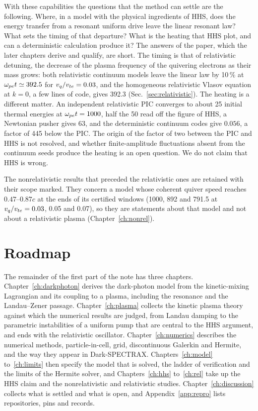 With these capabilities the questions that the method can settle are the following. Where, in a model with the physical ingredients of HHS, does the energy transfer from a resonant uniform drive leave the linear resonant law? What sets the timing of that departure? What is the heating that HHS plot, and can a deterministic calculation produce it? The answers of the paper, which the later chapters derive and qualify, are short. The timing is that of relativistic detuning, the decrease of the plasma frequency of the quivering electrons as their mass grows: both relativistic continuum models leave the linear law by 10\,\% at $\omega_{pe} t\simeq392.5$ for $v_q/v_{te}=0.03$, and the homogeneous relativistic Vlasov equation at $k=0$, a few lines of code, gives 392.3 (Sec.~\ref{sec:relativistic}). The heating is a different matter. An independent relativistic PIC converges to about 25 initial thermal energies at $\omega_{pe} t=1000$, half the 50 read off the figure of HHS, a Newtonian pusher gives 63, and the deterministic continuum codes give $0.056$, a factor of 445 below the PIC. The origin of the factor of two between the PIC and HHS is not resolved, and whether finite-amplitude fluctuations absent from the continuum seeds produce the heating is an open question. We do not claim that HHS is wrong.

The nonrelativistic results that preceded the relativistic ones are retained with their scope marked. They concern a model whose coherent quiver speed reaches $0.47$--$0.87c$ at the ends of its certified windows (1000, 892 and 791.5 at $v_q/v_{te}=0.03$, 0.05 and 0.07), so they are statements about that model and not about a relativistic plasma (Chapter~\ref{ch:nonrel}).

\section{Roadmap}

The remainder of the first part of the note has three chapters. Chapter~\ref{ch:darkphoton} derives the dark-photon model from the kinetic-mixing Lagrangian and its coupling to a plasma, including the resonance and the Landau--Zener passage. Chapter~\ref{ch:plasma} collects the kinetic plasma theory against which the numerical results are judged, from Landau damping to the parametric instabilities of a uniform pump that are central to the HHS argument, and ends with the relativistic oscillator. Chapter~\ref{ch:numerics} describes the numerical methods, particle-in-cell, grid, discontinuous Galerkin and Hermite, and the way they appear in Dark-SPECTRAX. Chapters~\ref{ch:model} to~\ref{ch:limits} then specify the model that is solved, the ladder of verification and the limits of the Hermite solver, and Chapters~\ref{ch:hhs} to~\ref{ch:rel} take up the HHS claim and the nonrelativistic and relativistic studies. Chapter~\ref{ch:discussion} collects what is settled and what is open, and Appendix~\ref{app:repro} lists repositories, pins and records.

